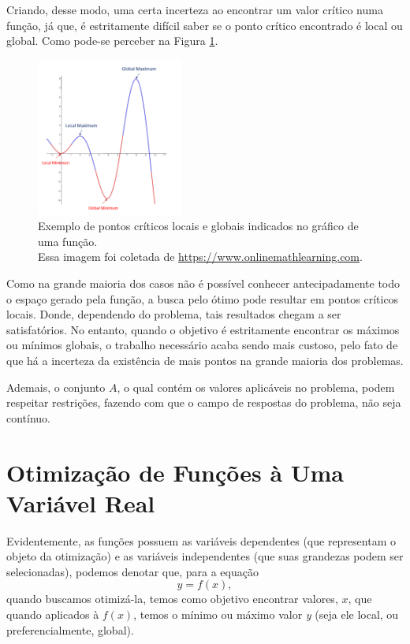 Criando, desse modo, uma certa incerteza ao encontrar um valor crítico numa função,
já que, é estritamente difícil saber se o ponto crítico encontrado é local ou
global. Como pode-se perceber na Figura
\ref{grafico_local_global_pontosCriticos}.

\begin{figure}[h]
    \centering
    \includegraphics[width=0.43\textwidth]{src/grafico_local_global_pontosCriticos.png}
    \captionsetup{justification=centering}
    \caption{
      Exemplo de pontos críticos locais e globais indicados no gráfico de uma função.\\
      \tiny Essa imagem foi coletada de \url{https://www.onlinemathlearning.com}.
    }
    \label{grafico_local_global_pontosCriticos}
\end{figure}

Como na grande maioria dos casos não é possível conhecer antecipadamente todo
o espaço gerado pela função, a busca pelo ótimo pode resultar em pontos
críticos locais. Donde, dependendo do problema, tais resultados chegam a ser
satisfatórios. No entanto, quando o objetivo é estritamente encontrar os máximos
ou mínimos globais, o trabalho necessário acaba sendo mais custoso, pelo fato de
que há a incerteza da existência de mais pontos na grande maioria dos problemas.

Ademais, o conjunto $A$, o qual contém os valores aplicáveis no problema, podem
respeitar restrições, fazendo com que o campo de respostas do problema, não seja
contínuo.

\section{{Otimização de Funções à Uma Variável Real}}\label{otim_uma_var}

\hspace{0.8cm}

Evidentemente, as funções possuem as variáveis dependentes (que representam o
objeto da otimização) e as variáveis independentes (que suas grandezas podem
ser selecionadas), podemos denotar que, para a equação
\begin{equation}
    y = f(x),
\end{equation}
quando buscamos otimizá-la, temos como objetivo encontrar valores, \(x\), que
quando aplicados à \(f(x)\), temos o mínimo ou máximo valor \textit{y} (seja
ele local, ou preferencialmente, global).


